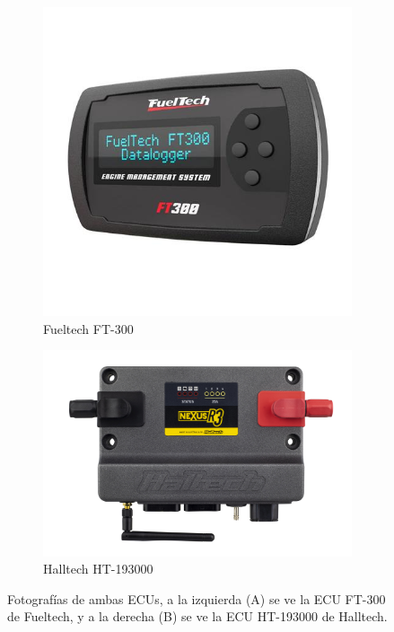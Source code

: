 \begin{figure}[htpb]
\centering
\begin{subfigure}{.4\textwidth}
\centering
\includegraphics[width=\textwidth]{./Figures/fueltech-ft300.jpg}
\caption{Fueltech FT-300}
\label{fig:fueltech}
\end{subfigure}
\hfill
\begin{subfigure}{.5\textwidth}
\centering
\includegraphics[width=\textwidth]{./Figures/HT-193000_00.JPG}
\caption{Halltech HT-193000}
\label{fig:halltech}
\end{subfigure}
\caption{Fotografías de ambas ECUs, a la izquierda (A) se ve la ECU FT-300 de Fueltech, y a la derecha (B) se ve la ECU HT-193000 de Halltech.\protect\footnotemark}
\label{fig:comparativa}
\end{figure}


